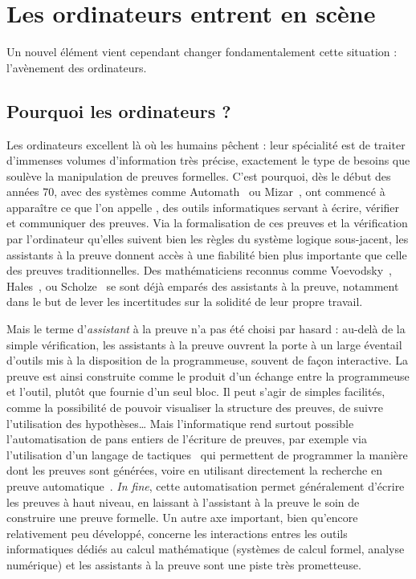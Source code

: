 \section{Les ordinateurs entrent en scène}
\label{sec:assistants-preuve}

Un nouvel élément vient cependant changer fondamentalement cette situation :
l’avènement des ordinateurs.

\subsection{Pourquoi les ordinateurs ?}

Les ordinateurs excellent là où les humains pêchent : leur spécialité est de traiter
d’immenses volumes d’information très précise, exactement le type
de besoins que soulève la manipulation de preuves formelles. C’est pourquoi, dès
le début des années 70, avec des systèmes comme Automath~
ou Mizar~, 
ont commencé à apparaître ce que l’on appelle , des outils informatiques servant à écrire, vérifier et communiquer des
preuves.
Via la formalisation de ces preuves et la vérification par l’ordinateur qu’elles
suivent bien les règles du système logique sous-jacent, les assistants à la preuve
donnent accès à une fiabilité bien plus importante que celle des preuves
traditionnelles. Des mathématiciens reconnus comme
Voevodsky~,
Hales~,
ou Scholze~
se sont déjà emparés des assistants à la preuve,
notamment dans le but de lever les incertitudes
sur la solidité de leur propre travail.

Mais le terme d’\emph{assistant} à la preuve n’a pas été choisi par hasard : au-delà
de la simple vérification, les assistants à la preuve ouvrent la porte à un large
éventail d’outils mis à la disposition de la programmeuse, souvent de façon
interactive. La preuve est ainsi construite comme le produit d’un échange entre 
la programmeuse et l’outil, plutôt que fournie d’un seul bloc.
Il peut s’agir de simples
facilités, comme la possibilité de pouvoir visualiser la structure des
preuves, de suivre l’utilisation des hypothèses…
Mais l’informatique rend surtout possible l’automatisation de pans entiers
de l’écriture de preuves,
par exemple via l’utilisation d’un langage de tactiques~
qui permettent de programmer la manière dont les preuves sont
générées, voire en utilisant directement la recherche en
preuve automatique~.
\textit{In fine}, cette automatisation permet généralement d’écrire
les preuves à haut niveau, en laissant à l’assistant à la preuve le soin
de construire une preuve formelle.
Un autre axe important, bien qu’encore relativement peu développé, concerne
les interactions entres les outils informatiques dédiés au calcul mathématique
(systèmes de calcul formel, analyse numérique) et les assistants à la
preuve sont une piste très prometteuse.

